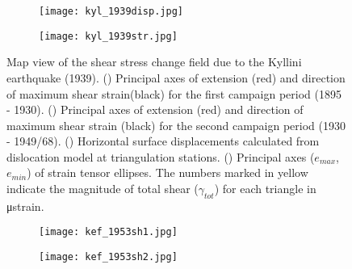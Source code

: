 \begin{extsum}
\begin{figure}[H]
\begin{subfigure}{.49\textwidth}
  \centering
      \texttt{[image: kyl\_1939disp.jpg]}
      \caption{}
      \label{fig_e:kyl_1939disp}
\end{subfigure}
\begin{subfigure}{.49\textwidth}
\centering
      \texttt{[image: kyl\_1939str.jpg]}
      \caption{}
      \label{fig_e:kyl_1939str}
\end{subfigure}
\caption{Map view of the shear stress change field due to the Kyllini earthquake (1939). () Principal axes of extension (red) and direction of maximum shear strain(black) for the first campaign period (1895 - 1930). () Principal axes of extension (red) and direction of maximum shear strain (black) for the second campaign period (1930 - 1949/68). () Horizontal surface displacements calculated from \citet{Okada1985} dislocation model at triangulation stations. () Principal axes (${e}_{max}$, ${e}_{min}$) of strain tensor ellipses. The numbers marked in yellow indicate the magnitude of total shear ($\gamma_{tot}$) for each triangle in μstrain.}
\label{fig_e:kyl_1939}
\end{figure}

\begin{figure}[H]
\centering
\begin{subfigure}{.49\textwidth}
  \centering
      \texttt{[image: kef\_1953sh1.jpg]}
      \caption{}
      \label{fig_e:kef_1953sh1}
\end{subfigure}
\begin{subfigure}{.49\textwidth}
\centering
      \texttt{[image: kef\_1953sh2.jpg]}
      \caption{}
      \label{fig_e:kef_1953sh2}
\end{subfigure}


\end{figure}
\end{extsum}
